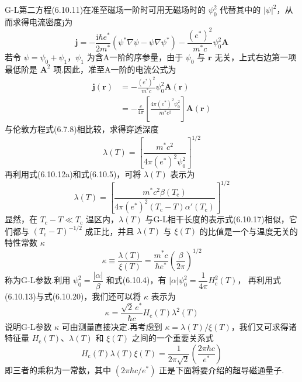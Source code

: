 G-L第二方程(6.10.11)在准至磁场一阶时可用无磁场时的 $\psi_{0}^{2}$ 代替其中的 $|\psi|^{2}$，从而求得电流密度j为
\begin{equation}
  \boldsymbol{j}=-\frac{\mathrm{i}\hbar e^{*}}{2m^{*}}
  \left(\psi^{*}\nabla\psi-\psi\nabla\psi^{*}\right)
  -\frac{\left(e^{*}\right)^{2}}{m^{*}c}\psi_{0}^{2}\boldsymbol{A}
\end{equation}
若令 $\psi=\psi_{0}+\psi_{1}$，$\psi_{1}$ 为含A一阶的序参量，由于 $\psi_{0}$ 与 $\boldsymbol{r}$ 无关，上式右边第一项最低阶是 $\boldsymbol{A}^{2}$ 项.因此，准至A一阶的电流公式为
\begin{equation}
\begin{aligned}
  \boldsymbol{j}(\boldsymbol{r})
  &=-\frac{\left(e^{*}\right)^{2}}{m^{*}c}\psi_{0}^{2}\boldsymbol{A}(\boldsymbol{r})\\
  &=-\frac{c}{4\pi}\left[\frac{4\pi\left(e^{*}\right)^{2}\psi_{0}^{2}}
  {m^{*}c^{2}}\right]\boldsymbol{A}(\boldsymbol{r})
\end{aligned}
\end{equation}
与伦敦方程式(6.7.8)相比较，求得穿透深度
\begin{equation}
  \lambda(T)=\left[\frac{m^{*}c^{2}}
  {4\pi\left(e^{*}\right)^{2}\psi_{0}^{2}}\right]^{1/2}
\end{equation}
再利用式(6.10.12a)和式(6.10.5)，可将 $\lambda(T)$ 表示为
\begin{equation}
  \lambda(T)=\left[\frac{m^{*}c^{2}\beta\left(T_{\mathrm{c}}\right)}
  {4\pi\left(e^{*}\right)^{2}\left(T_{\mathrm{c}}-T\right)
  \alpha'\left(T_{\mathrm{c}}\right)}\right]^{1/2}
\end{equation}
显然，在 $T_{\mathrm{c}}-T\ll T_{\mathrm{c}}$ 温区内，$\lambda(T)$ 与G-L相干长度的表示式(6.10.17)相似，它们都与 $\left(T_{\mathrm{c}}-T\right)^{-1/2}$ 成正比，并且 $\lambda(T)$ 与 $\xi(T)$ 的比值是一个与温度无关的特性常数 $\kappa$
\begin{equation}
  \kappa\equiv\frac{\lambda(T)}{\xi(T)}
  =\frac{m^{*}c}{\hbar e^{*}}\left(\frac{\beta}{2\pi}\right)^{1/2}
\end{equation}
称为G-L参数.利用 $\psi_{0}^{2}=\dfrac{|\alpha|}{\beta}$ 和式(6.10.4)，有
$|\alpha|\psi_{0}^{2}=\dfrac{1}{4\pi}H_{\mathrm{c}}^{2}(T)$，
再利用式(6.10.13)与式(6.10.20)，我们还可以将 $\kappa$ 表示为
\begin{equation}
  \kappa=\frac{\sqrt{2}\,e^{*}}{\hbar c}H_{\mathrm{c}}(T)\lambda^{2}(T)
\end{equation}
说明G-L参数 $\kappa$ 可由测量直接决定.再考虑到 $\kappa=\lambda(T)/\xi(T)$，我们又可求得诸特征量 $H_{\mathrm{c}}(T)$、$\lambda(T)$ 和 $\xi(T)$ 之间的一个重要关系式
\begin{equation}
  H_{\mathrm{c}}(T)\lambda(T)\xi(T)
  =\frac{1}{2\pi\sqrt{2}}\left(\frac{2\pi\hbar c}{e^{*}}\right)
\end{equation}
即三者的乘积为一常数，其中 $\left(2\pi\hbar c/e^{*}\right)$ 正是下面将要介绍的超导磁通量子.

